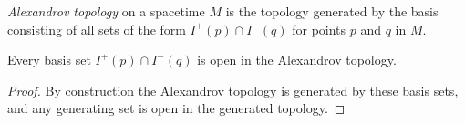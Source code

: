 \medskip

\begin{definition}
    \label{def:alexandrov-topology}
    \leanok
    \textit{Alexandrov topology} on a spacetime $M$ is the topology generated by the basis consisting of all sets of the form $I^+(p) \cap I^-(q)$ for points $p$ and $q$ in $M$.
\end{definition}

\medskip

\begin{lemma}
    \label{lmm:alexandrov-basis-open}
    \leanok
    Every basis set $I^+(p) \cap I^-(q)$ is open in the Alexandrov topology.
\end{lemma}
\begin{proof}
    \leanok
    By construction the Alexandrov topology is generated by these basis sets, and any generating set is open in the generated topology.
\end{proof}

\medskip

